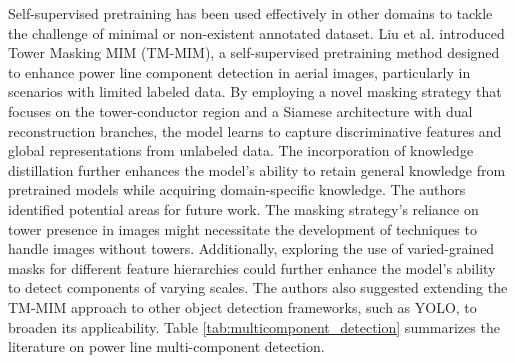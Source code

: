 Self-supervised pretraining has been used effectively in other domains to tackle the challenge of minimal or non-existent annotated dataset. Liu et al. \cite{liu2023tower} introduced Tower Masking MIM (TM-MIM), a self-supervised pretraining method designed to enhance power line component detection in aerial images, particularly in scenarios with limited labeled data. By employing a novel masking strategy that focuses on the tower-conductor region and a Siamese architecture with dual reconstruction branches, the model learns to capture discriminative features and global representations from unlabeled data. The incorporation of knowledge distillation further enhances the model's ability to retain general knowledge from pretrained models while acquiring domain-specific knowledge. The authors identified potential areas for future work. The masking strategy's reliance on tower presence in images might necessitate the development of techniques to handle images without towers. Additionally, exploring the use of varied-grained masks for different feature hierarchies could further enhance the model's ability to detect components of varying scales. The authors also suggested extending the TM-MIM approach to other object detection frameworks, such as YOLO, to broaden its applicability. Table \ref{tab:multicomponent_detection} summarizes the literature on power line multi-component detection.

